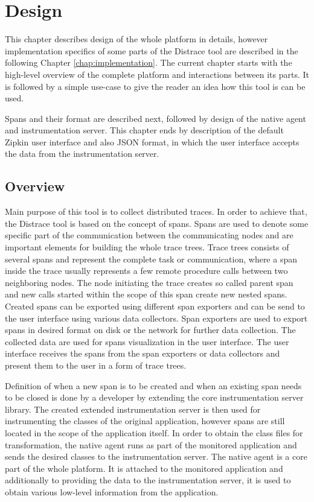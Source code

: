 \chapter{Design}
\label{chap:design}
This chapter describes design of the whole platform in details, however implementation specifics of some parts of the Distrace tool are described in the following Chapter \ref{chap:implementation}. The current chapter starts with the high-level overview of the complete platform and interactions between its parts. It is followed by a simple use-case to give the reader an idea how this tool is can be used.

Spans and their format are described next, followed by design of the native agent and instrumentation server. This chapter ends by description of the default Zipkin user interface and also JSON format, in which the user interface accepts the data from the instrumentation server. 

\section{Overview}
\label{design:overview}
Main purpose of this tool is to collect distributed traces. In order to achieve that, the Distrace tool is based on the concept of spans. Spans are used to denote some specific part of the communication between the communicating nodes and are important elements for building the whole trace trees. Trace trees consists of several spans and represent the complete task or communication, where a span inside the trace usually represents a few remote procedure calls between two neighboring nodes. The node initiating the trace creates so called parent span and new calls started within the scope of this span create new nested spans. Created spans can be exported using different span exporters and can be send to the user interface using various data collectors. Span exporters are used to export spans in desired format on disk or the network for further data collection. The collected data are used for spans visualization in the user interface. The user interface receives the spans from the span exporters or data collectors and present them to the user in a form of trace trees.

Definition of when a new span is to be created and when an existing span needs to be closed is done by a developer by extending the core instrumentation server library. The created extended instrumentation server is then used for instrumenting the classes of the original application, however spans are still located in the scope of the application itself. In order to obtain the class files for transformation, the native agent runs as part of the monitored application and sends the desired classes to the instrumentation server. The native agent is a core part of the whole platform. It is attached to the monitored application and additionally to providing the data to the instrumentation server, it is used to obtain various low-level information from the application. 

